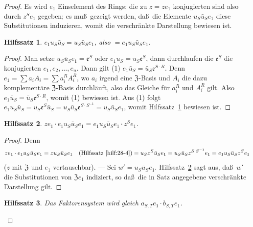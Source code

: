 \documentclass[12pt,a4paper]{article}
\theoremstyle{plain}
\newtheorem{hilfssatz}{Hilfssatz}[section]
\theoremstyle{definition}
\theoremstyle{remark}
\begin{document}
\begin{proof}
Es wird $e_{1}$ Einselement des Rings; die zu $z = ze_{1}$ konjugierten
sind also durch $z^{S}e_{1}$ gegeben; es mu\ss\ gezeigt werden, da\ss\ die
Elemente $u_{S}\bar{u}_{S}e_{1}$ diese Substitutionen induzieren, womit die
verschr\"ankte Darstellung bewiesen ist.

\begin{hilfssatz}\label{hilf:28-4}
$e_{1}u_{S}\bar{u}_{S} = u_{S}\bar{u}_{S}e_{1}$, also $= e_{1}u_{S}\bar{u}_{S}e_{1}$.
\end{hilfssatz}

\begin{proof}
Man setze $u_{S}\bar{u}_{S}e_{1} = \mathfrak{e}^{S}$ oder
$e_{1}u_{S} = u_{S}\mathfrak{e}^{S}$, dann durchlaufen die $\mathfrak{e}^{S}$ die
konjugierten $e_{1}, e_{2}, \ldots, e_{n}$. Dann gilt (1)
$e_{1}\bar{u}_{S} = \bar{u}_{S}\mathfrak{e}^{S\cdot R}$. Denn
$e_{1} = \sum a_{i}A_{i} = \sum a_{i}^{R}A_{i}^{R}$, wo $a_{i}$ irgend eine
$\mathfrak{Z}$-Basis und $A_{i}$ die dazu komplement\"are $\mathfrak{Z}$-Basis
durchl\"auft, also das Gleiche f\"ur $a_{i}^{R}$ und $A_{i}^{R}$ gilt. Also
$e_{1}\bar{u}_{S} = \bar{u}_{S}\mathfrak{e}^{S\cdot R}$, womit (1) bewiesen ist.
Aus (1) folgt $e_{1}u_{S}\bar{u}_{S} = u_{S}\mathfrak{e}^{S}\bar{u}_{S}
= u_{S}\bar{u}_{S}\mathfrak{e}^{S\cdot S^{-1}} = u_{S}\bar{u}_{S}e_{1}$, womit
Hilfssatz~\ref{hilf:28-4} bewiesen ist.
\end{proof}

\begin{hilfssatz}\label{hilf:28-5}
$ze_{1} \cdot e_{1}u_{S}\bar{u}_{S}e_{1} = e_{1}u_{S}\bar{u}_{S}e_{1} \cdot z^{S}e_{1}$.
\end{hilfssatz}

\begin{proof}
Denn
\[
ze_{1} \cdot e_{1}u_{S}\bar{u}_{S}e_{1} = zu_{S}\bar{u}_{S}e_{1}
\quad \text{(Hilfssatz~\ref{hilf:28-4})}
= u_{S}z^{S}\bar{u}_{S}e_{1} = u_{S}\bar{u}_{S}z^{S\cdot S^{-1}}e_{1}
= e_{1}u_{S}\bar{u}_{S}z^{S}e_{1}
\]
($z$ mit $\mathfrak{Z}$ und $e_{1}$ vertauschbar). --- Sei $w' = u_{S}\bar{u}_{S}e_{1}$.
Hilfssatz~\ref{hilf:28-5} sagt aus, da\ss\ $w'$ die Substitutionen von
$\mathfrak{Z}e_{1}$ indiziert, so da\ss\ die in Satz angegebene verschr\"ankte
Darstellung gilt.
\end{proof}

\begin{hilfssatz}\label{hilf:28-6}
Das Faktorensystem wird gleich $a_{S,T}e_{1} \cdot b_{S,T}e_{1}$.
\end{hilfssatz}


\end{proof}
\end{document}
